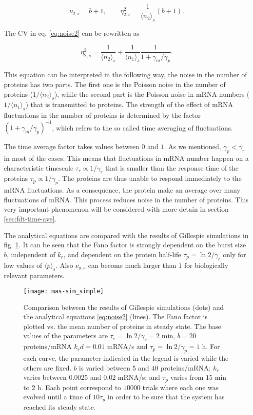\begin{equation*}
  \nu_{2,s} = b+1, \quad \quad \eta_{2,s}^2 = \frac{1}{\langle n_2\rangle_s}\left(b+1\right).
\end{equation*}

The CV in eq. \eqref{eq:noise2} can be rewritten as

\begin{equation*}
  \eta_{2,s}^2 = \frac{1}{\langle n_2\rangle_s}+\frac{1}{\langle n_1\rangle_s}\frac{1}{1+\gamma_m/\gamma_p}.
\end{equation*}

This equation can be interpreted in the following way, the noise in the number of proteins has two parts. The first one is the Poisson noise in the number of proteins ($1/\langle n_2\rangle_s$), while the second part is the Poisson noise in mRNA numbers ($1/\langle n_1\rangle_s$) that is transmitted to proteins. The strength of the effect of mRNA fluctuations in the number of proteins is determined by the factor $(1+\gamma_m/\gamma_p)^{-1}$, which refers to the so called time averaging of fluctuations.

The time average factor takes values between $0$ and $1$. As we mentioned, $\gamma_p<\gamma_r$ in most of the cases. This means that fluctuations in mRNA number happen on a characteristic timescale $\tau_r \propto 1/\gamma_r$  that is smaller than the response time of the proteins $\tau_p \propto 1/\gamma_p$. The proteins are thus unable to respond immediately to the mRNA fluctuations. As a consequence, the protein make an average over many fluctuations of mRNA. This process reduces noise in the number of proteins. This very important phenomenon will be considered with more detain in section \ref{sec:fdt-time-ave}.

The analytical equations are compared with the results of Gillespie simulations in fig. \ref{fig:mas-sim_simple}. It can be seen that the Fano factor is strongly dependent on the burst size $b$, independent of $k_r$, and dependent on the protein half-life $\tau_p = \ln2/\gamma_r$ only for low values of $\langle p\rangle_s$. Also $\nu_{p,s}$ can become much larger than $1$ for biologically relevant parameters.

\begin{figure}[H]
  \centering
  \texttt{[image: mas-sim\_simple]}
  \caption[Noise in proteins: comparing analytical results and Gillespie simulations]{\label{fig:mas-sim_simple} Comparison between the results of Gillespie simulations (dots) and the analytical equations \eqref{eq:noise2} (lines). The Fano factor is plotted vs. the mean number of proteins in steady state. The base values of the parameters are $\tau_r = \ln2/\gamma_r = 2$ min,  $b=20$ proteins/mRNA $k_rd = 0.01$ mRNA/s and $\tau_p = \ln2/\gamma_p = 1$ h. For each curve, the parameter indicated in the legend is varied while the others are fixed. $b$ is varied between $5$ and $40$ proteins/mRNA; $k_r$ varies between $0.0025$ and $0.02$ mRNA/s; and $\tau_p$ varies from $15$ min to $2$ h. Each point correspond to $10000$ trials where each one was evolved until a time of $10\tau_p$ in order to be sure that the system has reached its steady state.}
\end{figure}

